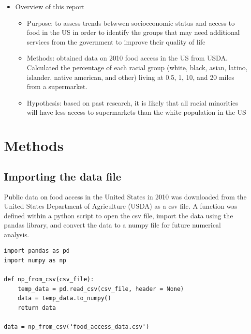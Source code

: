 \documentclass[letterpaper]{article} %
\begin{document}
\begin{itemize}
\begin{itemize}
		\end{itemize}
	\item Overview of this report
		\begin{itemize}\itemsep -.1cm\vspace{-.25cm}
			\item Purpose: to assess trends betwwen socioeconomic status and access to food in the US in order to identify the groups that may need additional services from the government to improve their quality of life
			\item Methods: obtained data on 2010 food access in the US from USDA. Calculated the percentage of each racial group (white, black, asian, latino, islander, native american, and other) living at 0.5, 1, 10, and 20 miles from a supermarket.
			\item Hypothesis: based on past research, it is likely that all racial minorities will have less access to supermarkets than the white population in the US
		\end{itemize}
\end{itemize}

\section{Methods}

\subsection{Importing the data file} 

Public data on food access in the United States in 2010 was downloaded from the United States Department of Agriculture (USDA) as a csv file.  A function was defined within a python script to open the csv file, import the data using the pandas library, and convert the data to a numpy file for future numerical analysis.
\vspace{0.25cm}

\lstset{language=Python}
\begin{lstlisting}[frame=single]  
import pandas as pd
import numpy as np

def np_from_csv(csv_file):
    temp_data = pd.read_csv(csv_file, header = None)
    data = temp_data.to_numpy()
    return data

data = np_from_csv('food_access_data.csv')

\end{lstlisting}
\end{document}
